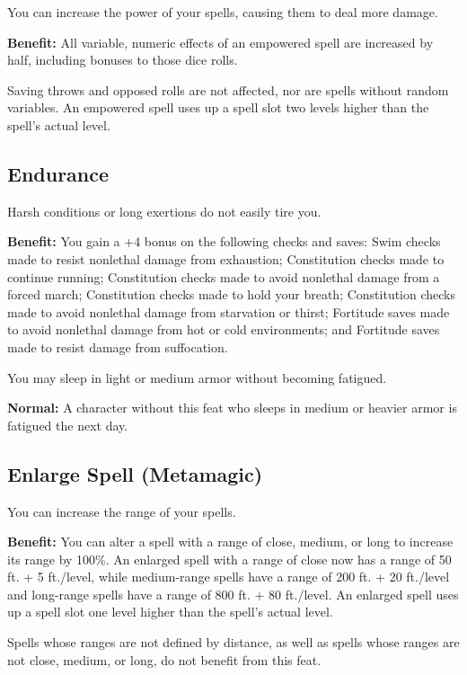 				
You can increase the power of your spells, causing them to deal more damage.
				
\textbf{Benefit:} All variable, numeric effects of an empowered spell are increased by half, including bonuses to those dice rolls.

Saving throws and opposed rolls are not affected, nor are spells without random variables. An empowered spell uses up a spell slot two levels higher than the spell's actual level.
				
\subsection{Endurance}

				
Harsh conditions or long exertions do not easily tire you.
				
\textbf{Benefit:} You gain a +4 bonus on the following checks and saves: Swim checks made to resist nonlethal damage from exhaustion; Constitution checks made to continue running; Constitution checks made to avoid nonlethal damage from a forced march; Constitution checks made to hold your breath; Constitution checks made to avoid nonlethal damage from starvation or thirst; Fortitude saves made to avoid nonlethal damage from hot or cold environments; and Fortitude saves made to resist damage from suffocation.

You may sleep in light or medium armor without becoming fatigued.
				
\textbf{Normal:} A character without this feat who sleeps in medium or heavier armor is fatigued the next day.
				
\subsection{Enlarge Spell (Metamagic)}

				
You can increase the range of your spells.
				
\textbf{Benefit:} You can alter a spell with a range of close, medium, or long to increase its range by 100\%. An enlarged spell with a range of close now has a range of 50 ft. + 5 ft./level, while medium-range spells have a range of 200 ft. + 20 ft./level and long-range spells have a range of 800 ft. + 80 ft./level. An enlarged spell uses up a spell slot one level higher than the spell's actual level.

Spells whose ranges are not defined by distance, as well as spells whose ranges are not close, medium, or long, do not benefit from this feat.
				
